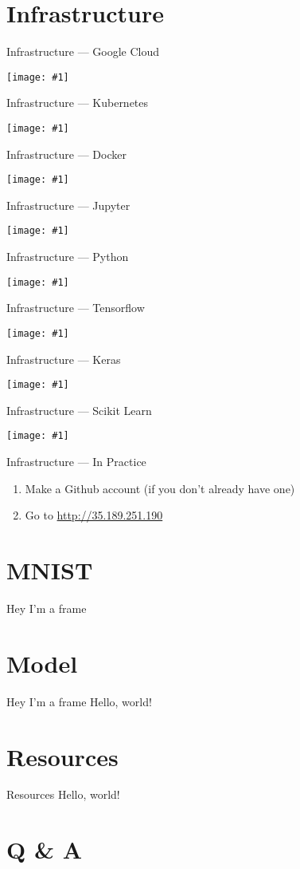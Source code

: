 \documentclass{beamer}
\newcommand\cimgsm[1]{\vfill\centerline{\texttt{[image: \#1]}}\vfill}
\begin{document}
\section{Infrastructure}
\label{sec:infra}
\begin{frame}{Infrastructure --- Google Cloud}
  \cimgsm{google-cloud.png}
\end{frame}
\begin{frame}{Infrastructure --- Kubernetes}
  \cimgsm{kubernetes.png}
\end{frame}
\begin{frame}{Infrastructure --- Docker}
  \cimgsm{docker.jpg}
\end{frame}
\begin{frame}{Infrastructure --- Jupyter}
  \cimgsm{jupyter.png}
\end{frame}
\begin{frame}{Infrastructure --- Python}
  \cimgsm{python.png}
\end{frame}
\begin{frame}{Infrastructure --- Tensorflow}
  \cimgsm{tensorflow.png}
\end{frame}
\begin{frame}{Infrastructure --- Keras}
  \cimgsm{keras.jpg}
\end{frame}
\begin{frame}{Infrastructure --- Scikit Learn}
  \cimgsm{scikit.png}
\end{frame}
\begin{frame}{Infrastructure --- In Practice}
  \begin{enumerate}
  \item Make a Github account (if you don't already have one)
  \item Go to \url{http://35.189.251.190}
  \end{enumerate}
\end{frame}

\section{MNIST}
\label{sec:mnist}
\begin{frame}{Hey I'm a frame}
  
\end{frame}

\section{Model}
\label{sec:model}
\begin{frame}{Hey I'm a frame}
  Hello, world!
\end{frame}

\section{Resources}
\label{sec:resources}
\begin{frame}{Resources}
  Hello, world!
\end{frame}

\section{Q \& A}
\label{sec:qa}
\end{document}
